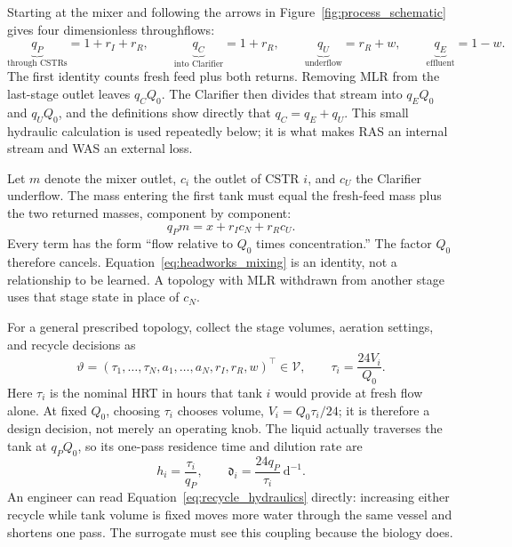 \documentclass[a4paper,fleqn]{cas-sc}
\begin{document}
Starting at the mixer and following the arrows in Figure~\ref{fig:process_schematic} gives four dimensionless throughflows:
\begin{equation}
\label{eq:network_flows}
\underbrace{q_P}_{\text{through CSTRs}}=1+r_I+r_R,\qquad
\underbrace{q_C}_{\text{into Clarifier}}=1+r_R,
\qquad
\underbrace{q_U}_{\text{underflow}}=r_R+w,
\qquad
\underbrace{q_E}_{\text{effluent}}=1-w.
\end{equation}
The first identity counts fresh feed plus both returns. Removing MLR from the last-stage outlet leaves $q_CQ_0$. The Clarifier then divides that stream into $q_EQ_0$ and $q_UQ_0$, and the definitions show directly that $q_C=q_E+q_U$. This small hydraulic calculation is used repeatedly below; it is what makes RAS an internal stream and WAS an external loss.

Let $m$ denote the mixer outlet, $c_i$ the outlet of CSTR $i$, and $c_U$ the Clarifier underflow. The mass entering the first tank must equal the fresh-feed mass plus the two returned masses, component by component:
\begin{equation}
\label{eq:headworks_mixing}
q_Pm=x+r_Ic_N+r_Rc_U.
\end{equation}
Every term has the form ``flow relative to $Q_0$ times concentration.'' The factor $Q_0$ therefore cancels. Equation~\eqref{eq:headworks_mixing} is an identity, not a relationship to be learned. A topology with MLR withdrawn from another stage uses that stage state in place of $c_N$.

For a general prescribed topology, collect the stage volumes, aeration settings, and recycle decisions as
\begin{equation}
\label{eq:general_operating_vector}
\vartheta=
\left(\tau_1,\ldots,\tau_N,
a_1,\ldots,a_N,r_I,r_R,w\right)^\top\in\mathcal V,
\qquad
\tau_i=\frac{24V_i}{Q_0}.
\end{equation}
Here $\tau_i$ is the nominal HRT in hours that tank $i$ would provide at fresh flow alone. At fixed $Q_0$, choosing $\tau_i$ chooses volume, $V_i=Q_0\tau_i/24$; it is therefore a design decision, not merely an operating knob. The liquid actually traverses the tank at $q_PQ_0$, so its one-pass residence time and dilution rate are
\begin{equation}
\label{eq:recycle_hydraulics}
h_i=\frac{\tau_i}{q_P},
\qquad
\mathfrak d_i=\frac{24q_P}{\tau_i}\ \mathrm{d}^{-1}.
\end{equation}
An engineer can read Equation~\eqref{eq:recycle_hydraulics} directly: increasing either recycle while tank volume is fixed moves more water through the same vessel and shortens one pass. The surrogate must see this coupling because the biology does.
\end{document}
